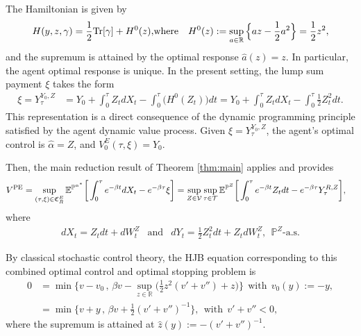 \documentclass[11pt,a4paper]{article}
\numberwithin{equation}{section}
\def\dbE{\mathbb{E}}
\def\dbP{\mathbb{P}}
\def\dbR{\mathbb{R}}
\newcommand{\cT}{\mathcal{T}}
\newcommand{\cV}{\mathcal{V}}
\newcommand{\beaa}{\begin{eqnarray*}}
\newcommand{\eeaa}{\end{eqnarray*}}
\theoremstyle{definition}
\begin{document}
The Hamiltonian is given by
 \beaa
  H(y,z,\gamma)
  =
  \frac12{\rm Tr}[\gamma]+H^0(z),
 &\mbox{where}&
 H^0(z)
 :=
 \sup_{a\in\dbR} \Big\{az-\frac12a^2\Big\}
 =
 \frac12 z^2,
 \eeaa
and the supremum is attained by the optimal response $\widehat a(z)=z$. In particular, the agent optimal response is unique. In the present setting, the lump sum payment $\xi$ takes the form
 \begin{align*}
   \xi = Y^{Y_0,Z}_\tau 
    &= Y_0+\int_0^\tau \! Z_t dX_t - \int_0^\tau\!\big(H^0(Z_t)\big)dt  
     = Y_0+\int_0^\tau \! Z_t dX_t - \int_0^\tau\!\frac12 Z_t^2dt.
 \end{align*}
This representation is a direct consequence of the dynamic programming principle satisfied by the agent dynamic value process.
Given $\xi = Y_\tau^{Y_0,Z}$, the agent's optimal control is $\widehat\alpha = Z$, and $V_0^E(\tau,\xi) = Y_0$.

Then, the main reduction result of Theorem \ref{thm:main} applies and provides
 \begin{align*}
   V^{\rm PE}
     &= \sup_{(\tau,\xi)\in\mathfrak{C}_R^E}
        \dbE^{\dbP^{\alpha^*}}\bigg[ \int_0^\tau e^{-\beta t}dX_t-e^{-\beta\tau}\xi\bigg] 
      = \sup_{Z\in\cV}\sup_{\tau\in\cT} \dbE^{\dbP^{Z}}\bigg[ \int_0^\tau e^{-\beta t}Z_tdt-e^{-\beta\tau}Y^{R,Z}_\tau\bigg],
 \end{align*}
where 
 \beaa
 dX_t
 =
 Z_tdt + dW^Z_t
 &\mbox{and}&
 dY_t
 =
   \frac12 Z_t^2 dt+Z_t dW^Z_t,
 ~~\dbP^{Z}\mbox{-a.s.}
 \eeaa

By classical stochastic control theory, the HJB equation corresponding to this combined optimal control and optimal stopping problem is
 \begin{align} \label{DPEv}
   0  
    &=
     \min\Big\{v-v_0
                  \,,\,
                  \beta v-\sup_{z\in\dbR}\Big(\frac12z^2(v'+v'')+z\Big) 
         \Big\} 
       ~~\mbox{with}~~v_0(y):=-y,  \\
    &=
     \min\Big\{ v+y
                  \,,\,
                  \beta v+\frac12(v'+v'')^{-1}
         \Big\},
       ~~\mbox{with}~~v'+v''<0, \nonumber
 \end{align}
 where the supremum is attained at $\widehat z(y):=-(v'+v'')^{-1}$. 
\end{document}
